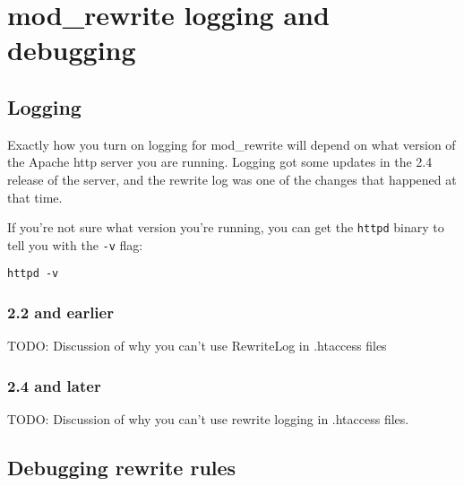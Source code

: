 \chapter{mod\_rewrite logging and debugging}

\section{Logging}
\label{rewritelogging}

Exactly how you turn on logging for mod\_rewrite will depend on what version of the Apache http server you are running. Logging got some updates in the 2.4 release of the server, and the rewrite log was one of the changes that happened at that time.

If you're not sure what version you're running, you can get the \verb~httpd~ binary to tell you with the \verb~-v~ flag:

\begin{verbatim}
httpd -v
\end{verbatim}

\subsection{2.2 and earlier}

TODO: Discussion of why you can't use RewriteLog in .htaccess files

\subsection{2.4 and later}

TODO: Discussion of why you can't use rewrite logging in .htaccess files.

\section{Debugging rewrite rules}
